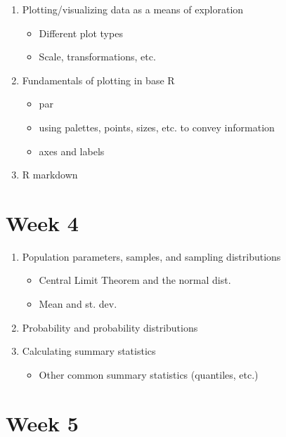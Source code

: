 \documentclass[]{book}
\providecommand{\tightlist}{%
  \setlength{\itemsep}{0pt}\setlength{\parskip}{0pt}}
\begin{document}
\begin{enumerate}
\def\labelenumi{\arabic{enumi}.}
\tightlist
\item
  Plotting/visualizing data as a means of exploration

  \begin{itemize}
  \tightlist
  \item
    Different plot types
  \item
    Scale, transformations, etc.
  \end{itemize}
\item
  Fundamentals of plotting in base R

  \begin{itemize}
  \tightlist
  \item
    par
  \item
    using palettes, points, sizes, etc. to convey information
  \item
    axes and labels
  \end{itemize}
\item
  R markdown
\end{enumerate}

\hypertarget{week-4}{%
\section{Week 4}\label{week-4}}

\begin{enumerate}
\def\labelenumi{\arabic{enumi}.}
\item
  Population parameters, samples, and sampling distributions

  \begin{itemize}
  \tightlist
  \item
    Central Limit Theorem and the normal dist.
  \item
    Mean and st. dev.
  \end{itemize}
\item
  Probability and probability distributions
\item
  Calculating summary statistics

  \begin{itemize}
  \tightlist
  \item
    Other common summary statistics (quantiles, etc.)
  \end{itemize}
\end{enumerate}

\hypertarget{week-5}{%
\section{Week 5}\label{week-5}}
\end{document}

